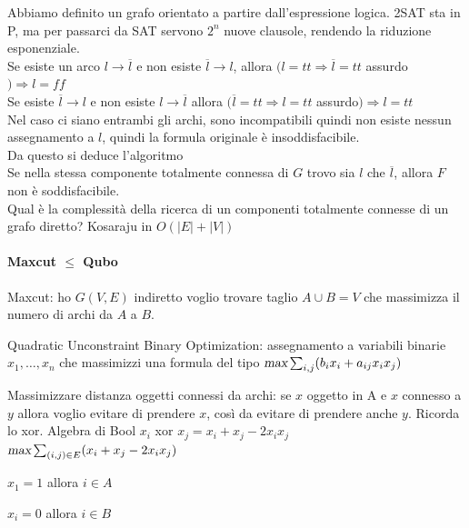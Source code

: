 \documentclass[10pt]{book}
\begin{document}
Abbiamo definito un grafo orientato a partire dall'espressione logica. 2SAT sta in P, ma per passarci da SAT servono $2^n$ nuove clausole, rendendo la riduzione esponenziale.\\
Se esiste un arco $l\rightarrow \overline{l}$ e non esiste $\overline{l} \rightarrow l $, allora $(l = tt \Rightarrow \overline{l} = tt$ assurdo$) \Rightarrow l = ff$\\
Se esiste $\overline{l} \rightarrow l $ e non esiste $l\rightarrow \overline{l}$ allora $(\overline{l} = tt \Rightarrow l = tt$ assurdo$) \Rightarrow l = tt$\\
Nel caso ci siano entrambi gli archi, sono incompatibili quindi non esiste nessun assegnamento a $l$, quindi la formula originale è insoddisfacibile.\\
Da questo si deduce l'algoritmo\\
Se nella stessa componente totalmente connessa di $G$ trovo sia $l$ che $\overline{l}$, allora $F$ non è soddisfacibile.\\
Qual è la complessità della ricerca di un componenti totalmente connesse di un grafo diretto? Kosaraju in $O(|E| + |V|)$
\paragraph{Maxcut $\leq$ Qubo} \begin{list}{}{}
	\item Maxcut: ho $G(V,E)$ indiretto voglio trovare taglio $A\cup B = V$ che massimizza il numero di archi da $A$ a $B$.
	\item Quadratic Unconstraint Binary Optimization: assegnamento a variabili binarie $x_1,\ldots,x_n$ che massimizzi una formula del tipo $\textsl{max}\sum_{i,j} (b_ix_i + a_{ij}x_ix_j)$
\end{list}
Massimizzare distanza oggetti connessi da archi: se $x$ oggetto in A e $x$ connesso a $y$ allora voglio evitare di prendere $x$, così da evitare di prendere anche $y$. Ricorda lo xor.
Algebra di Bool $x_i$ xor $x_j = x_i + x_j - 2x_ix_j$\\
$\textsl{max}\sum_{(i,j)\in E}(x_i + x_j - 2x_ix_j)$
\begin{list}{}{}
	\item $x_1 = 1$ allora $i \in A$
	\item $x_i = 0$ allora $i \in B$
\end{list}
\end{document}
